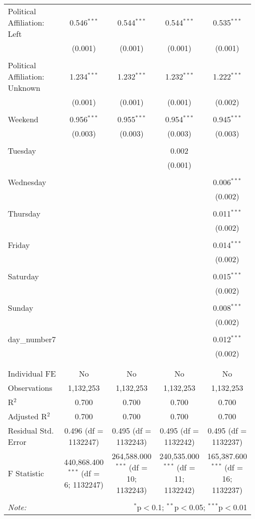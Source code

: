 \documentclass[
]{article}
\begin{document}
\begin{table}[!htbp]
{\begin{tabular}{@{\extracolsep{5pt}}lcccc}
 Political Affiliation: Left & 0.546$^{***}$ & 0.544$^{***}$ & 0.544$^{***}$ & 0.535$^{***}$ \\ 
  & (0.001) & (0.001) & (0.001) & (0.001) \\ 
  & & & & \\ 
 Political Affiliation: Unknown & 1.234$^{***}$ & 1.232$^{***}$ & 1.232$^{***}$ & 1.222$^{***}$ \\ 
  & (0.001) & (0.001) & (0.001) & (0.002) \\ 
  & & & & \\ 
 Weekend & 0.956$^{***}$ & 0.955$^{***}$ & 0.954$^{***}$ & 0.945$^{***}$ \\ 
  & (0.003) & (0.003) & (0.003) & (0.003) \\ 
  & & & & \\ 
 Tuesday &  &  & 0.002 &  \\ 
  &  &  & (0.001) &  \\ 
  & & & & \\ 
 Wednesday &  &  &  & 0.006$^{***}$ \\ 
  &  &  &  & (0.002) \\ 
  & & & & \\ 
 Thursday &  &  &  & 0.011$^{***}$ \\ 
  &  &  &  & (0.002) \\ 
  & & & & \\ 
 Friday &  &  &  & 0.014$^{***}$ \\ 
  &  &  &  & (0.002) \\ 
  & & & & \\ 
 Saturday &  &  &  & 0.015$^{***}$ \\ 
  &  &  &  & (0.002) \\ 
  & & & & \\ 
 Sunday &  &  &  & 0.008$^{***}$ \\ 
  &  &  &  & (0.002) \\ 
  & & & & \\ 
 day\_number7 &  &  &  & 0.012$^{***}$ \\ 
  &  &  &  & (0.002) \\ 
  & & & & \\ 
\hline \\[-1.8ex] 
Individual FE & No & No & No & No \\ 
Observations & 1,132,253 & 1,132,253 & 1,132,253 & 1,132,253 \\ 
R$^{2}$ & 0.700 & 0.700 & 0.700 & 0.700 \\ 
Adjusted R$^{2}$ & 0.700 & 0.700 & 0.700 & 0.700 \\ 
Residual Std. Error & 0.496 (df = 1132247) & 0.495 (df = 1132243) & 0.495 (df = 1132242) & 0.495 (df = 1132237) \\ 
F Statistic & 440,868.400$^{***}$ (df = 6; 1132247) & 264,588.000$^{***}$ (df = 10; 1132243) & 240,535.000$^{***}$ (df = 11; 1132242) & 165,387.600$^{***}$ (df = 16; 1132237) \\ 
\hline 
\hline \\[-1.8ex] 
\textit{Note:}  & \multicolumn{4}{r}{$^{*}$p$<$0.1; $^{**}$p$<$0.05; $^{***}$p$<$0.01} \\ 
\end{tabular}
} 
\end{table} 
\newpage
\end{document}
